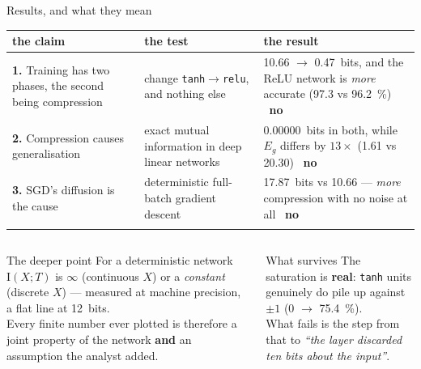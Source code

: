 \documentclass[aspectratio=169,11pt]{beamer}
\newcommand{\I}{\mathrm{I}}
\newcommand{\no}{\textcolor{bad}{\textbf{no}}}
\begin{document}
\begin{frame}{Results, and what they mean}
\centering\footnotesize
\begin{tabular}{@{}L{3.4cm}L{3.7cm}L{5.1cm}@{}}
\toprule
\textbf{the claim} & \textbf{the test} & \textbf{the result} \\
\midrule
\addlinespace[2pt]
\textbf{1.} Training has two phases, the second being compression &
  change \texttt{tanh}$\to$\texttt{relu}, and nothing else &
  \SI{10.66}{} $\to$ \SI{0.47}{bits}, and the ReLU network is \emph{more} accurate
  (\SI{97.3}{} vs \SI{96.2}{\percent}) \ \no \\
\addlinespace[6pt]
\textbf{2.} Compression causes generalisation &
  exact mutual information in deep linear networks &
  \SI{0.00000}{bits} in both, while $E_g$ differs by $13\times$ (1.61 vs 20.30) \ \no \\
\addlinespace[6pt]
\textbf{3.} SGD's diffusion is the cause &
  deterministic full-batch gradient descent &
  \SI{17.87}{bits} vs \SI{10.66}{} --- \emph{more} compression with no noise at all \ \no \\
\addlinespace[2pt]
\bottomrule
\end{tabular}
\medskip
\begin{columns}[T]
\begin{column}{0.52\textwidth}
\begin{alertblock}{\small The deeper point}
\footnotesize
For a deterministic network $\I(X;T)$ is $\infty$ (continuous $X$) or a \emph{constant}
(discrete $X$) --- measured at machine precision, a flat line at \SI{12}{bits}.\\[3pt]
Every finite number ever plotted is therefore a joint property of the network \textbf{and}
an assumption the analyst added.
\end{alertblock}
\end{column}
\begin{column}{0.46\textwidth}
\begin{block}{\small What survives}
\footnotesize
The saturation is \textbf{real}: \texttt{tanh} units genuinely do pile up against
$\pm 1$ (\SI{0}{} $\to$ \SI{75.4}{\percent}).\\[3pt]
What fails is the step from that to \emph{``the layer discarded ten bits about the
input''}.
\end{block}
\end{column}
\end{columns}
\end{frame}
\end{document}
